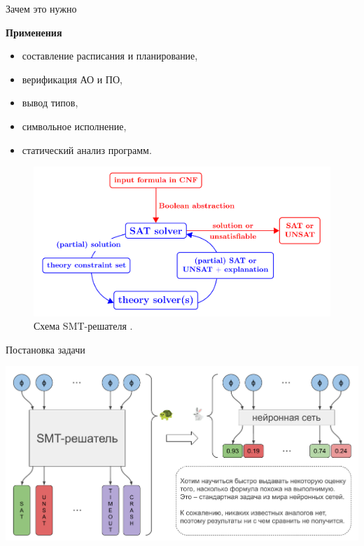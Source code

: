 \documentclass[14pt,aspectratio=169,hyperref={pdftex,unicode},xcolor=dvipsnames]{beamer}
\begin{document}
\begin{frame}{Зачем это нужно}

\begin{minipage}{0.5\textwidth}

\textbf{Применения}
\begin{itemize}
  \item составление расписания и планирование,
  \item верификация АО и ПО,
  \item вывод типов,
  \item {\color{magenta}символьное исполнение},
  \item статический анализ программ.
\end{itemize}

\end{minipage}%
\begin{minipage}{0.5\textwidth}

\begin{figure}[ht]
\begin{center}
  \includegraphics[scale=0.125]{./assets/smt-solver-working-scheme.png}
  \caption{Схема SMT-решателя \cite{smt-solver-working-scheme}.}
\end{center}
\end{figure}

\end{minipage}

\end{frame}



\begin{frame}{Постановка задачи}

\begin{center}
  \includegraphics[scale=0.4]{./assets/problem-statement.pdf}
\end{center}

\end{frame}
\end{document}
